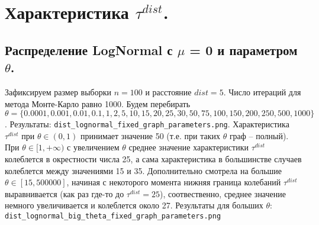 \documentclass{report}
\begin{document}
\section{Характеристика $\tau^{dist}$.}
\subsection{Распределение LogNormal с $\mu$ = 0 и параметром $\theta$.}
Зафиксируем размер выборки $n = 100$ и расстояние $dist = 5$. Число итераций для метода Монте-Карло равно 1000.
\newline
\newline
Будем перебирать $\theta = \{0.0001, 0.001, 0.01, 0.1, 1, 2, 5, 10, 15, 20, 25, 30, 50, 75, 100, 150, 200, 250, 500, 1000\}$.
\newline
\newline
Результаты: \texttt{dist\_lognormal\_fixed\_graph\_parameters.png}. 
\newline
\newline
Характеристика $\tau^{dist}$ при $\theta \in (0, 1)$ принимает значение 50 (т.е. при таких $\theta$ граф -- полный). 
\newline
\newline
При $\theta \in [1, +\infty)$ с увеличением $\theta$ среднее значение характеристики $\tau^{dist}$ колеблется в окрестности числа 25, а сама характеристика в большинстве случаев колеблется между значениями 15 и 35.
\newline
\newline
Дополнительно смотрела на большие $\theta \in [15, 500000]$, начиная с некоторого момента нижняя граница колебаний $\tau^{dist}$ выравнивается (как раз где-то до $\tau^{dist} = 25$), соотвественно, среднее значение немного увеличивается и колеблется около 27.
\newline
\newline
Результаты для больших $\theta$: \texttt{dist\_lognormal\_big\_theta\_fixed\_graph\_parameters.png}
\end{document}
